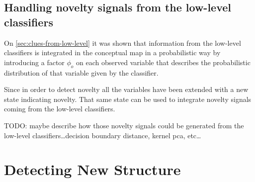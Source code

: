 \subsection{Handling novelty signals from the low-level classifiers}
On \autoref{sec:clues-from-low-level} it was shown that information from the
low-level classifiers is integrated in the conceptual map in a probabilistic
way by introducing a factor $\phi_o$ on each observed variable that describes
the probabilistic distribution of that variable given by the classifier.

Since in order to detect novelty all the variables have been extended with a
new state indicating novelty. That same state can be used to integrate novelty
signals coming from the low-level classifiers.

TODO: maybe describe how those novelty signals could be generated from the
low-level classifiers\dots decision boundary distance, kernel pca, etc\dots


\section{Detecting New Structure}

